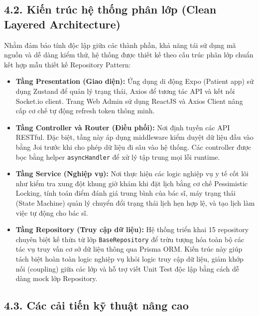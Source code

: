\documentclass[12pt,a4paper]{report}
\begin{document}
\subsection*{4.2. Kiến trúc hệ thống phân lớp (Clean Layered Architecture)}
\hspace{1em} Nhằm đảm bảo tính độc lập giữa các thành phần, khả năng tái sử dụng mã nguồn và dễ dàng kiểm thử, hệ thống được thiết kế theo cấu trúc phân lớp chuẩn kết hợp mẫu thiết kế Repository Pattern:
\begin{itemize}
    \item \textbf{Tầng Presentation (Giao diện):} Ứng dụng di động Expo (Patient app) sử dụng Zustand để quản lý trạng thái, Axios để tương tác API và kết nối Socket.io client. Trang Web Admin sử dụng ReactJS và Axios Client nâng cấp cơ chế tự động refresh token thông minh.
    
    \item \textbf{Tầng Controller và Router (Điều phối):} Nơi định tuyến các API RESTful. Đặc biệt, tầng này áp dụng middleware kiểm duyệt dữ liệu đầu vào bằng Joi trước khi cho phép dữ liệu đi sâu vào hệ thống. Các controller được bọc bằng helper \texttt{asyncHandler} để xử lý tập trung mọi lỗi runtime.
    
    \item \textbf{Tầng Service (Nghiệp vụ):} Nơi thực hiện các logic nghiệp vụ y tế cốt lõi như kiểm tra xung đột khung giờ khám khi đặt lịch bằng cơ chế Pessimistic Locking, tính toán điểm đánh giá trung bình của bác sĩ, máy trạng thái (State Machine) quản lý chuyển đổi trạng thái lịch hẹn hợp lệ, và tạo lịch làm việc tự động cho bác sĩ.
    
    \item \textbf{Tầng Repository (Truy cập dữ liệu):} Hệ thống triển khai 15 repository chuyên biệt kế thừa từ lớp \texttt{BaseRepository} để trừu tượng hóa toàn bộ các tác vụ truy vấn cơ sở dữ liệu thông qua Prisma ORM. Kiến trúc này giúp tách biệt hoàn toàn logic nghiệp vụ khỏi logic truy cập dữ liệu, giảm khớp nối (coupling) giữa các lớp và hỗ trợ viết Unit Test độc lập bằng cách dễ dàng mock lớp Repository.
\end{itemize}

\subsection*{4.3. Các cải tiến kỹ thuật nâng cao}
\end{document}

